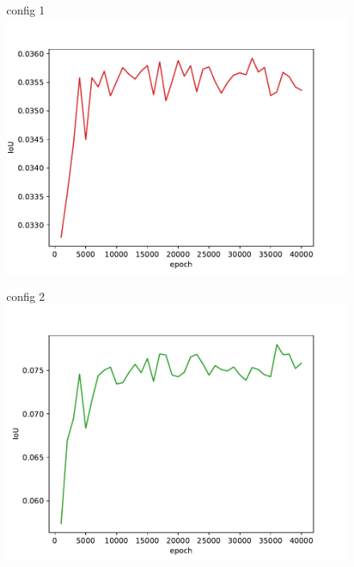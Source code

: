 \documentclass[11pt,a4paper,DIV=14,headinclude=false,footinclude=false]{scrartcl}
\begin{document}
\begin{figure}[h]\centering
    \begin{minipage}{.5\textwidth} \centering
        config 1
        \includegraphics[width=\linewidth,keepaspectratio,clip,trim=0 0 30px 30px]{plots/config1.pdf}
    \end{minipage}\hfill
    \begin{minipage}{.5\textwidth}\centering
        config 2
        \includegraphics[width=\linewidth,keepaspectratio,clip,trim=0 0 30px 30px]{plots/config2.pdf}
     \end{minipage}\\[\baselineskip]

\end{figure}
\end{document}
